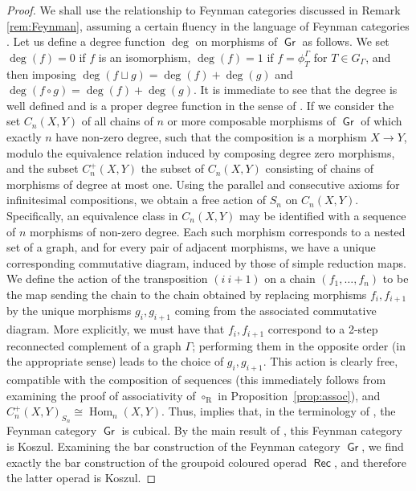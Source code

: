 \documentclass[11pt]{article}
\theoremstyle{definition}
\numberwithin{equation}{section}
\DeclareMathOperator{\rmR}{\mathrm{R}}
\DeclareMathOperator{\Gr}{\mathsf{Gr}}
\DeclareMathOperator{\Hom}{Hom}
\DeclareMathOperator{\Rec}{\mathsf{Rec}}
\begin{document}
\begin{proof}
We shall use the relationship to Feynman categories discussed in Remark \ref{rem:Feynman}, assuming a certain fluency in the language of Feynman categories \cite{MR3636409}. Let us define a degree function $\deg$ on morphisms of $\Gr$ as follows. We set $\deg(f)=0$ if $f$ is an isomorphism, $\deg(f)=1$ if $f=\phi^\Gamma_T$ for $T\in G_\Gamma$, and then imposing
$\deg(f\sqcup g)=\deg(f)+ \deg(g)$
and
$\deg(f\circ g)=\deg(f)+\deg(g)$. 
It is immediate to see that the degree is well defined and is a proper degree function in the sense of \cite[Def.~7.2.1]{MR3636409}. If we consider the set $C_n(X,Y)$ of all chains of $n$ or more composable morphisms of $\Gr$ of which exactly $n$ have non-zero degree, such that the composition is a morphism $X\to Y$, modulo the equivalence relation induced by composing degree zero morphisms, and the subset $C^+_n(X,Y)$ the subset of $C_n(X,Y)$ consisting of chains of morphisms of degree at most one. Using the parallel and consecutive axioms for infinitesimal compositions, we obtain a free action of $S_n$ on $C_n(X,Y)$. Specifically, an equivalence class in $C_n(X,Y)$ may be identified with a sequence of $n$ morphisms of non-zero degree. Each such morphism corresponds to a nested set of a graph, and for every pair of adjacent morphisms, we have a unique corresponding commutative diagram, induced by those of simple reduction maps. We define the action of the transposition $(i\ i+1)$ on a chain $(f_1,\ldots,f_n)$ to be the map sending the chain to the chain obtained by replacing morphisms  $f_i,f_{i+1}$ by the unique morphisms $g_i,g_{i+1}$ coming from the associated commutative diagram. More explicitly, we must have that $f_i,f_{i+1}$ correspond to a 2-step reconnected complement of a graph $\Gamma$; performing them in the opposite order (in the appropriate sense) leads to the choice of $g_i,g_{i+1}$. This action is clearly free, compatible with the composition of sequences (this immediately follows from examining the proof of associativity of $\circ_{\rmR}$ in Proposition~\ref{prop:assoc}), and $C^+_n(X,Y)_{S_n}\cong \Hom_n(X,Y)$. Thus, implies that, in the terminology of \cite[Def.~7.2.2]{MR3636409}, the Feynman category $\Gr$ is cubical. By the main result of \cite{KWKoszul}, this Feynman category is Koszul. Examining the bar construction of the Feynman category $\Gr$, we find exactly the bar construction of the groupoid coloured operad $\Rec$, and therefore the latter operad is Koszul.   
\end{proof}
\end{document}
